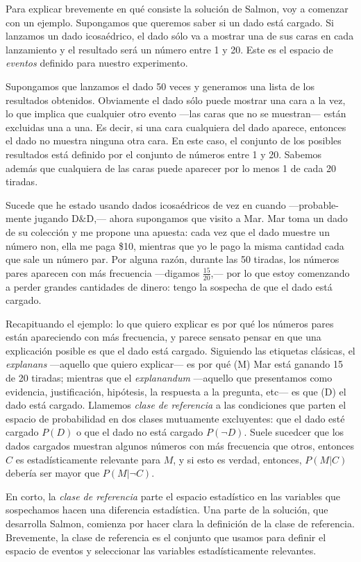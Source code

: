 Para explicar brevemente en qué consiste la solución de Salmon, voy a
comenzar con un ejemplo. Supongamos que queremos saber si un dado
está cargado. Si lanzamos un dado icosaédrico, el dado sólo va a
mostrar una de sus caras en cada lanzamiento y el resultado será un
número entre 1 y 20. Este es el espacio de \emph{eventos} definido
para nuestro experimento.

Supongamos que lanzamos el dado 50 veces y generamos una lista de los
resultados obtenidos. Obviamente el dado sólo puede mostrar una cara
a la vez, lo que implica que cualquier otro evento ---las caras que
no se muestran--- están excluidas una a una. Es decir, si una cara
cualquiera del dado aparece, entonces el dado no muestra ninguna otra
cara. En este caso, el conjunto de los posibles resultados está
definido por el conjunto de números entre 1 y 20. Sabemos además que
cualquiera de las caras puede aparecer por lo menos 1 de cada 20
tiradas.

Sucede que he estado usando dados icosaédricos de vez en cuando
---probable-mente jugando D$\&$D,--- ahora supongamos que visito a
Mar. Mar toma un dado de su colección y me propone una apuesta: cada
vez que el dado muestre un número non, ella me paga \$10, mientras
que yo le pago la misma cantidad cada que sale un número par. Por
alguna razón, durante las 50 tiradas, los números pares aparecen con
más frecuencia ---digamos $\frac {15}{20}$,--- por lo que estoy
comenzando a perder grandes cantidades de dinero: tengo la sospecha
de que el dado está cargado.

Recapituando el ejemplo: lo que quiero explicar es por qué los
números pares están apareciendo con más frecuencia, y parece sensato
pensar en que una explicación posible es que el dado está cargado.
Siguiendo las etiquetas clásicas, el \emph{explanans} ---aquello que
quiero explicar--- es por qué (M) Mar está ganando 15 de 20 tiradas;
mientras que el \emph {explanandum} ---aquello que presentamos como
evidencia, justificación, hipótesis, la respuesta a la pregunta,
etc--- es que (D) el dado está cargado. Llamemos \emph{clase de
 referencia} a las condiciones que parten el espacio de probabilidad
en dos clases mutuamente excluyentes: que el dado esté cargado $P(D)$
o que el dado no está cargado $P(\neg D)$. Suele sucedcer que los
dados cargados muestran algunos números con más frecuencia que otros,
entonces $C$ es estadísticamente relevante para $M$, y si esto es
verdad, entonces, $P(M|C)$ debería ser mayor que $P(M|\neg C )$.

En corto, la \emph{clase de referencia} parte el espacio estadístico
en las variables que sospechamos hacen una diferencia estadística.
Una parte de la solución, que desarrolla Salmon, comienza por hacer
clara la definición de la clase de referencia. Brevemente, la clase
de referencia es el conjunto que usamos para definir el espacio de
eventos y seleccionar las variables estadísticamente relevantes.

